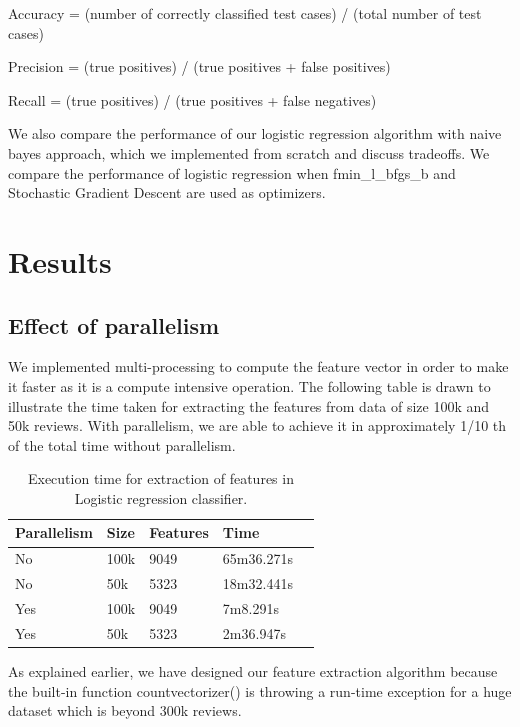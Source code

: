 \documentclass{article}
\begin{document}
Accuracy = (number of correctly classified test cases) / (total number of test cases) 


Precision = (true positives) / (true positives + false positives)


Recall =  (true positives) / (true positives + false negatives)


We also compare the performance of our logistic regression algorithm with naive bayes approach, which we implemented from scratch and discuss tradeoffs. We compare the performance of logistic regression when fmin\_l\_bfgs\_b and Stochastic Gradient Descent are used as optimizers.

\section{Results}


\subsection{Effect of parallelism}
We implemented multi-processing to compute the feature vector in order to make it faster as it is a compute intensive operation. The following table is drawn to illustrate the time taken for extracting the features from data of size 100k and 50k reviews. With parallelism, we are able to achieve it in approximately 1/10 th of the total time without parallelism.


\begin{table}[H]
\caption{Execution time for extraction of features in Logistic regression classifier.}
\label{sample-table}
\begin{center}
\begin{small}
\begin{sc}
\begin{tabular}{lllll}
\hline
Parallelism & Size & Features & Time \\
\hline
No  & 100k & 9049 & 65m36.271s \\
No  & 50k & 5323 & 18m32.441s \\
Yes  & 100k & 9049 & 7m8.291s \\
Yes  & 50k & 5323 & 2m36.947s \\
\hline
\end{tabular}
\end{sc}
\end{small}
\end{center}
\end{table}


As explained earlier, we have designed our feature extraction algorithm because the built-in function countvectorizer() is throwing a run-time exception for a huge dataset which is beyond 300k reviews.
\end{document}
